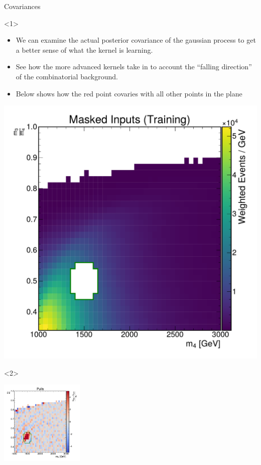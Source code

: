 \documentclass[10pt]{beamer}
\begin{document}
\begin{frame}{Covariances}
  \begin{onlyenv}<1>
    \begin{splitcol}[0.65]
      \begin{col}
        \begin{itemize}
        \item We can examine the actual posterior covariance of the gaussian process to get a better sense of what the kernel is learning.
        \item See how the more advanced kernels take in to account the ``falling direction'' of the combinatorial background.
        \item Below shows how the red point covaries with all other points in the plane
        \end{itemize}
      \end{col}
      \begin{col}
        \includegraphics[width=1.0\textwidth]{figures/training_points}
      \end{col}
    \end{splitcol}
  \end{onlyenv}
  \begin{onlyenv}<2>
    \begin{center}
      \begin{annotimage}{\includegraphics[width=0.30\textwidth]{figures/2dpullplots/rbf/E_1500_0p5_150_0p07.pdf}}

\end{annotimage}
\end{center}
\end{onlyenv}
\end{frame}
\end{document}
